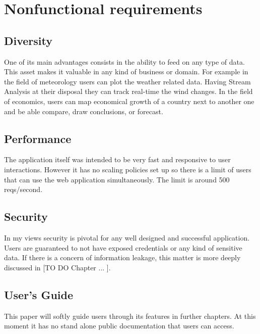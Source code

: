 \section{Nonfunctional requirements}
\label{chap:02:01}

\subsection{Diversity}
\label{chap:02:01:01}
One of its main advantages consists in the ability to feed on any type of data. This asset makes it valuable in any kind of business or domain. For example in the field of meteorology users can plot the weather related data. Having Stream Analysis at their disposal they can track real-time the wind changes. In the field of economics, users can map economical growth of a country next to another one and be able compare, draw conclusions, or forecast.

\subsection{Performance}
\label{chap:02:01:02}
The application itself was intended to be very fast and responsive to user interactions. However it has no scaling policies set up so there is a limit of users that can use the web application simultaneously. The limit is around 500 reqs/second.

\subsection{Security}
\label{chap:02:01:03}
In my views security is pivotal for any well designed and successful application. Users are guaranteed to not have exposed credentials or any kind of sensitive data. If there is a concern of information leakage, this matter is more deeply discussed in [TO DO Chapter ... ].  

\subsection{User's Guide}
\label{chap:02:01:04}
This paper will softly guide users through its features in further chapters. At this moment it has no stand alone public documentation that users can access.

